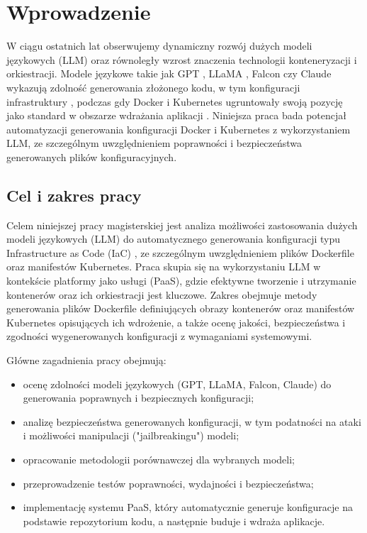 \clearpage %
\section{Wprowadzenie}

W ciągu ostatnich lat obserwujemy dynamiczny rozwój dużych modeli językowych (LLM) \cite{zhao_survey_2025} oraz równoległy wzrost znaczenia technologii konteneryzacji i orkiestracji. Modele językowe takie jak GPT \cite{brown_language_2020}, LLaMA \cite{touvron_llama_2023}, Falcon \cite{almazrouei_falcon_2023} czy Claude \cite{anthropic_claude} wykazują zdolność generowania złożonego kodu, w tym konfiguracji infrastruktury \cite{srivatsa_survey_2024}, podczas gdy Docker \cite{merkel_docker_nodate} i Kubernetes \cite{burns_borg_2016} ugruntowały swoją pozycję jako standard w obszarze wdrażania aplikacji \cite{kratzke_dont_2024}. Niniejsza praca bada potencjał automatyzacji generowania konfiguracji Docker i Kubernetes z wykorzystaniem LLM, ze szczególnym uwzględnieniem poprawności i bezpieczeństwa generowanych plików konfiguracyjnych.

\subsection{Cel i zakres pracy}

Celem niniejszej pracy magisterskiej jest analiza możliwości zastosowania dużych modeli językowych (LLM) do automatycznego generowania konfiguracji typu Infrastructure as Code (IaC) \cite{pahl_infrastructure_nodate}, ze szczególnym uwzględnieniem plików Dockerfile oraz manifestów Kubernetes. Praca skupia się na wykorzystaniu LLM w kontekście platformy jako usługi (PaaS), gdzie efektywne tworzenie i utrzymanie kontenerów oraz ich orkiestracji jest kluczowe. Zakres obejmuje metody generowania plików Dockerfile definiujących obrazy kontenerów oraz manifestów Kubernetes opisujących ich wdrożenie, a także ocenę jakości, bezpieczeństwa i zgodności wygenerowanych konfiguracji z wymaganiami systemowymi.

Główne zagadnienia pracy obejmują:
\begin{itemize}
    \item ocenę zdolności modeli językowych (GPT, LLaMA, Falcon, Claude) do generowania poprawnych i bezpiecznych konfiguracji;
    \item analizę bezpieczeństwa generowanych konfiguracji, w tym podatności na ataki i możliwości manipulacji ("jailbreakingu") modeli;
    \item opracowanie metodologii porównawczej dla wybranych modeli;
    \item przeprowadzenie testów poprawności, wydajności i bezpieczeństwa;
    \item implementację systemu PaaS, który automatycznie generuje konfiguracje na podstawie repozytorium kodu, a następnie buduje i wdraża aplikacje.
\end{itemize}

